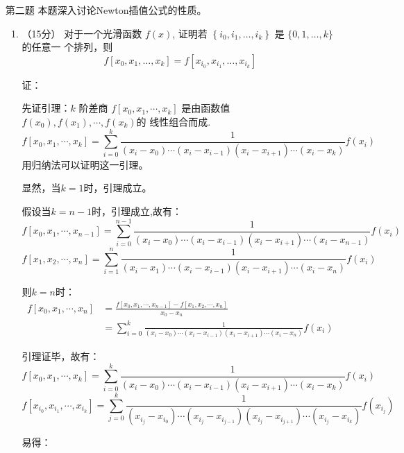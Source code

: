 \documentclass[12pt,a4paper,UTF8]{ctexart}
\theoremstyle{nonumberplain}
\begin{document}
\begin{enumerate}
\begin{enumerate}
\end{enumerate}
\item[第二题] 本题深入讨论Newton插值公式的性质。
\begin{enumerate}\item（15分） 对于一个光滑函数 $f(x)$, 证明若 $\left\{i_{0}, i_{1}, \ldots, i_{k}\right\}$ 是 $\{0,1, \ldots, k\}$ 的任意一 个排列，则
$$
f\left[x_{0}, x_{1}, \ldots, x_{k}\right]=f\left[x_{i_{0}}, x_{i_{1}}, \ldots, x_{i_{k}}\right]
$$
\par 证：
\par 先证引理：$k$ 阶差商 $f\left[x_{0}, x_{1}, \cdots, x_{k}\right]$ 是由函数值 $f\left(x_{0}\right), f\left(x_{1}\right), \cdots, f\left(x_{k}\right)$的
线性组合而成.
$$
f\left[x_{0}, x_{1}, \cdots, x_{k}\right]=\sum_{i=0}^{k} \frac{1}{\left(x_{i}-x_{0}\right) \cdots\left(x_{i}-x_{i-1}\right)\left(x_{i}-x_{i+1}\right) \cdots\left(x_{i}-x_{k}\right)} f\left(x_{i}\right)
$$
用归纳法可以证明这一引理。
\par 显然，当$k=1$时，引理成立。
\par 假设当$k=n-1$时，引理成立,故有：
$$f\left[x_{0}, x_{1}, \cdots, x_{n-1}\right]=\sum_{i=0}^{n-1} \frac{1}{\left(x_{i}-x_{0}\right) \cdots\left(x_{i}-x_{i-1}\right)\left(x_{i}-x_{i+1}\right) \cdots\left(x_{i}-x_{n-1}\right)} f\left(x_{i}\right)$$
$$f\left[x_{1}, x_{2},\cdots, x_{n}\right]=\sum_{i=1}^{n} \frac{1}{\left(x_{i}-x_{1}\right) \cdots\left(x_{i}-x_{i-1}\right)\left(x_{i}-x_{i+1}\right) \cdots\left(x_{i}-x_{n}\right)} f\left(x_{i}\right)$$
\par 则$k=n$时：
$$
\begin{aligned}
  f\left[x_{0}, x_{1}, \cdots, x_{n}\right] & =\frac{f\left[x_{0}, x_{1}, \cdots, x_{n-1}\right]-f\left[x_{1}, x_{2},\cdots, x_{n}\right]}{x_{0}-x_{n}}\\
 & =\sum_{i=0}^{k} \frac{1}{\left(x_{i}-x_{0}\right) \cdots\left(x_{i}-x_{i-1}\right)\left(x_{i}-x_{i+1}\right) \cdots\left(x_{i}-x_{n}\right)} f\left(x_{i}\right)\end{aligned}
$$
\par 引理证毕，故有：
$$
f\left[x_{0}, x_{1}, \cdots, x_{k}\right]=\sum_{i=0}^{k} \frac{1}{\left(x_{i}-x_{0}\right) \cdots\left(x_{i}-x_{i-1}\right)\left(x_{i}-x_{i+1}\right) \cdots\left(x_{i}-x_{k}\right)} f\left(x_{i}\right)
$$
$$
f\left[x_{i_{0}}, x_{i_{1}}, \cdots, x_{i_{k}}\right]=\sum_{j=0}^{k} \frac{1}{\left(x_{i_{j}}-x_{i_{0}}\right) \cdots\left(x_{i_{j}}-x_{i_{j-1}}\right)\left(x_{i_{j}}-x_{i_{j+1}}\right) \cdots\left(x_{i_{j}}-x_{i_{k}}\right)} f\left(x_{i_{j}}\right)
$$
\par 易得：

\end{enumerate}
\end{enumerate}
\end{document}
